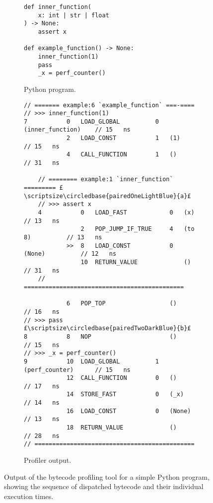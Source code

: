 \begin{figure}[H]
    \centering
    \begin{subfigure}[b]{0.3\textwidth}
       \centering
        \begin{verbatim}
def inner_function(
    x: int | str | float
) -> None:
    assert x

def example_function() -> None:
    inner_function(1)
    pass
    _x = perf_counter()
        \end{verbatim}
        \footnotesize\vspace{8em}
        \caption{Python program.}
        \label{listing:profiler-example-python}
    \end{subfigure}
    \hfill
    \begin{subfigure}[b]{0.65\textwidth}
        \centering
        \begin{verbatim}
// ======= example:6 `example_function` ===-====
// >>> inner_function(1)
7           0   LOAD_GLOBAL          0   (inner_function)    // 15   ns
            2   LOAD_CONST           1   (1)                 // 15   ns
            4   CALL_FUNCTION        1   ()                  // 31   ns

    // ======== example:1 `inner_function` ========= £\scriptsize\circledbase{pairedOneLightBlue}{a}£
    // >>> assert x
    4           0   LOAD_FAST            0   (x)             // 13   ns
                2   POP_JUMP_IF_TRUE     4   (to 8)          // 13   ns
            >>  8   LOAD_CONST           0   (None)          // 12   ns
                10  RETURN_VALUE             ()              // 31   ns
    // =============================================

            6   POP_TOP                  ()                  // 16   ns
// >>> pass                                                     £\scriptsize\circledbase{pairedTwoDarkBlue}{b}£
8           8   NOP                      ()                  // 15   ns
// >>> _x = perf_counter()
9           10  LOAD_GLOBAL          1   (perf_counter)      // 15   ns
            12  CALL_FUNCTION        0   ()                  // 17   ns
            14  STORE_FAST           0   (_x)                // 14   ns
            16  LOAD_CONST           0   (None)              // 13   ns
            18  RETURN_VALUE             ()                  // 28   ns
// =============================================
        \end{verbatim}
        \caption{Profiler output.}
        \label{listing:profiler-example-bytecode}
    \end{subfigure}
    \vspace{1em}
    \captionsetup{name=Listing}
    \caption{Output of the bytecode profiling tool for a simple Python program, showing the sequence of dispatched bytecode and their individual execution times.}
    \label{listing:profiler-example}
\end{figure}








